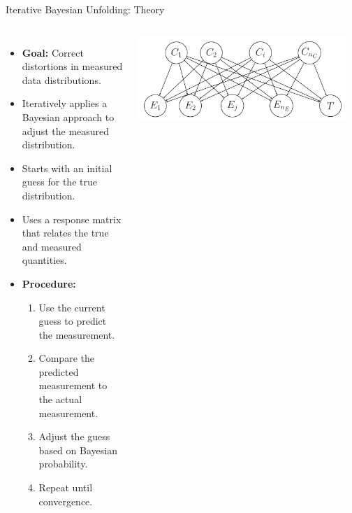 \documentclass[aspectratio=169]{beamer}
\begin{document}
\begin{frame}{Iterative Bayesian Unfolding: Theory}
\begin{columns}
    \begin{itemize}
            \item \textbf{Goal:} Correct distortions in measured data distributions.
            \item Iteratively applies a Bayesian approach to adjust the measured distribution.
            \item Starts with an initial guess for the true distribution.
            \item Uses a response matrix that relates the true and measured quantities.
            \item \textbf{Procedure:}
                \begin{enumerate}
                    \item Use the current guess to predict the measurement.
                    \item Compare the predicted measurement to the actual measurement.
                    \item Adjust the guess based on Bayesian probability.
                    \item Repeat until convergence.
                \end{enumerate}
        \end{itemize}
        
    \includegraphics[width=0.95\textwidth]{Main/ibu/theory.png} %
    
\end{columns}
 

\end{frame}
\end{document}
